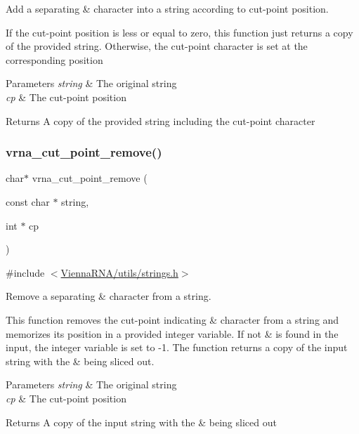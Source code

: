 Add a separating \textquotesingle{}\&\textquotesingle{} character into a string according to cut-\/point position. 

If the cut-\/point position is less or equal to zero, this function just returns a copy of the provided string. Otherwise, the cut-\/point character is set at the corresponding position


\begin{DoxyParams}{Parameters}
{\em string} & The original string \\
\hline
{\em cp} & The cut-\/point position \\
\hline
\end{DoxyParams}
\begin{DoxyReturn}{Returns}
A copy of the provided string including the cut-\/point character 
\end{DoxyReturn}
\mbox{\label{group__string__utils_ga1fbd821d4408cc5f1dd9d12c15e092cb}} 
\subsubsection{\texorpdfstring{vrna\+\_\+cut\+\_\+point\+\_\+remove()}{vrna\_cut\_point\_remove()}}
{\footnotesize\ttfamily char$\ast$ vrna\+\_\+cut\+\_\+point\+\_\+remove (\begin{DoxyParamCaption}\item[{const char $\ast$}]{string,  }\item[{int $\ast$}]{cp }\end{DoxyParamCaption})}



{\ttfamily \#include $<$\hyperlink{strings_8h}{Vienna\+R\+N\+A/utils/strings.\+h}$>$}



Remove a separating \textquotesingle{}\&\textquotesingle{} character from a string. 

This function removes the cut-\/point indicating \textquotesingle{}\&\textquotesingle{} character from a string and memorizes its position in a provided integer variable. If not \textquotesingle{}\&\textquotesingle{} is found in the input, the integer variable is set to -\/1. The function returns a copy of the input string with the \textquotesingle{}\&\textquotesingle{} being sliced out.


\begin{DoxyParams}{Parameters}
{\em string} & The original string \\
\hline
{\em cp} & The cut-\/point position \\
\hline
\end{DoxyParams}
\begin{DoxyReturn}{Returns}
A copy of the input string with the \textquotesingle{}\&\textquotesingle{} being sliced out 
\end{DoxyReturn}
